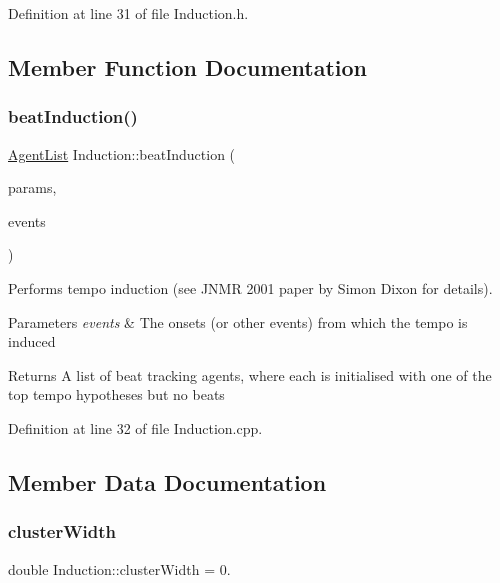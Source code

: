 Definition at line 31 of file Induction.\+h.



\subsection{Member Function Documentation}
\mbox{\label{class_induction_ad6cfd2e62ae5262273d83a0b858bee33}} 
\subsubsection{\texorpdfstring{beat\+Induction()}{beatInduction()}}
{\footnotesize\ttfamily \hyperlink{class_agent_list}{Agent\+List} Induction\+::beat\+Induction (\begin{DoxyParamCaption}\item[{const \hyperlink{class_agent_parameters}{Agent\+Parameters} \&}]{params,  }\item[{const Event\+List \&}]{events }\end{DoxyParamCaption})\hspace{0.3cm}{\ttfamily [static]}}

Performs tempo induction (see J\+N\+MR 2001 paper by Simon Dixon for details). 
\begin{DoxyParams}{Parameters}
{\em events} & The onsets (or other events) from which the tempo is induced \\
\hline
\end{DoxyParams}
\begin{DoxyReturn}{Returns}
A list of beat tracking agents, where each is initialised with one of the top tempo hypotheses but no beats 
\end{DoxyReturn}


Definition at line 32 of file Induction.\+cpp.



\subsection{Member Data Documentation}
\mbox{\label{class_induction_a2ab726717d99a6edb75bcd47c4ecdec4}} 
\subsubsection{\texorpdfstring{cluster\+Width}{clusterWidth}}
{\footnotesize\ttfamily double Induction\+::cluster\+Width = 0.\hspace{0.3cm}{\ttfamily [static]}}

